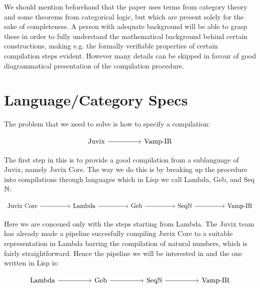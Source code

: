 We should mention beforehand that the paper uses terms from category theory and some theorems from categorical logic, but which are present solely for the sake of completeness. A person with adequate background will be able to grasp these in order to fully understand the mathematical background behind certain constructions, making e.g. the formally verifiable properties of certain compilation steps evident. However many details can be skipped in favour of good diagrammatical presentation of the compilation procedure.

\section{Language/Category Specs}

The problem that we need to solve is how to specify a compilation:

\[\begin{tikzcd}
	{\text{Juvix} } && {\text{Vamp-IR}}
	\arrow[from=1-1, to=1-3]
\end{tikzcd}\]

The first step in this is to provide a good compilation from a sublanguage of Juvix, namely Juvix Core. The way we do this is by breaking up the procedure into compilations through languages which in Lisp we call Lambda, Geb, and Seq$\mathbb{N}$:

\[\begin{tikzcd}
	{\text{Juvix Core}} && {\text{Lambda}} && {\text{Geb}} && {\text{Seq$\N$} } && {\text{Vamp-IR}}
	\arrow[from=1-3, to=1-5]
	\arrow[from=1-5, to=1-7]
	\arrow[from=1-7, to=1-9]
	\arrow[from=1-1, to=1-3]
\end{tikzcd}\]

Here we are concened only with the steps starting from Lambda. The Juvix team has already made a pipeline succesfully compiling Juvix Core to a suitable representation in Lambda barring the compilation of natural numbers, which is fairly straightforward. Hence the pipeline we will be interested in and the one written in Lisp is:

\[\begin{tikzcd}
	{\text{Lambda}} && {\text{Geb}} && {\text{Seq$\N$} } && {\text{Vamp-IR}}
	\arrow[from=1-1, to=1-3]
	\arrow[from=1-3, to=1-5]
	\arrow[from=1-5, to=1-7]
\end{tikzcd}\]

